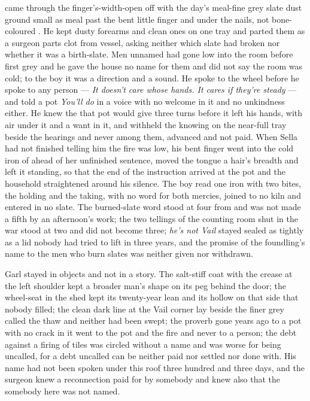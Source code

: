  came through the finger's-width-open  off  with the day's meal-fine grey slate dust ground small as meal past the bent little finger and under the nails, not bone-coloured . He kept dusty forearms and clean ones on one tray and parted them as a surgeon parts clot from vessel, asking neither which slate had broken nor whether it was a birth-slate. Men unnamed had gone low into the room before first grey and he gave the house no name for them and did not say the room was cold; to the boy it was a direction and a sound. He spoke to the wheel before he spoke to any person --- \emph{It doesn't care whose hands. It cares if they're steady} --- and told a pot \emph{You'll do} in a voice with no welcome in it and no unkindness either. He knew the  that pot would give three turns before it left his hands, with air under it and a want in it, and withheld the knowing on the near-full tray beside the hearings and never among them, advanced and not paid. When Sella had not finished telling him the fire was low, his bent finger went into the cold iron of  ahead of her unfinished sentence, moved the tongue a hair's breadth and left it standing, so that the end of the instruction arrived at the pot and the household straightened around his silence. The boy read one iron with two bites, the holding and the taking, with no  word for both mercies, joined to no kiln and entered in no slate. The burned-slate word stood at four from  and was not made a fifth by an afternoon's work; the two tellings of the counting room shut in the war stood at two and did not become three; \emph{he's not Vail} stayed sealed as tightly as a lid nobody had tried to lift in three years, and the promise of the foundling's name to the men who burn slates was neither given nor withdrawn.

Garl stayed in objects and not in a story. The salt-stiff coat with the crease at the left shoulder kept a broader man's shape on its peg behind the door; the wheel-seat in the shed kept its twenty-year lean and its hollow on that side that nobody filled; the clean dark line at the Vail corner lay beside the finer grey called the thaw and neither had been swept; the proverb gone years ago to a pot with no crack in it went to the pot and the fire and never to a person; the debt against a firing of tiles was circled without a name and was worse for being uncalled, for a debt uncalled can be neither paid nor settled nor done with. His name had not been spoken under this roof three hundred and three days, and the surgeon knew a reconnection paid for by somebody and knew also that the somebody here was not named.

